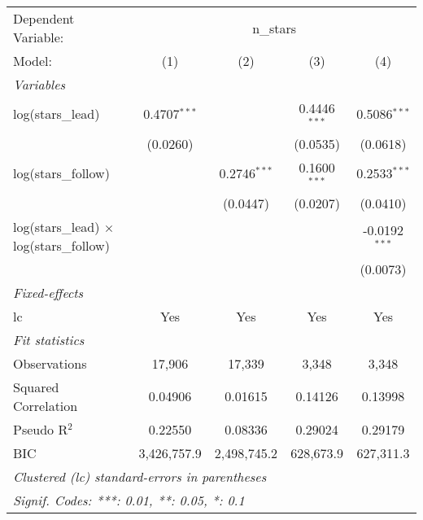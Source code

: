 
\begingroup
\centering
\begin{tabular}{lcccc}
   \tabularnewline \midrule \midrule
   Dependent Variable: & \multicolumn{4}{c}{n\_stars}\\
   Model:                                          & (1)            & (2)            & (3)            & (4)\\  
   \midrule
   \emph{Variables}\\
   log(stars\_lead)                                & 0.4707$^{***}$ &                & 0.4446$^{***}$ & 0.5086$^{***}$\\   
                                                   & (0.0260)       &                & (0.0535)       & (0.0618)\\   
   log(stars\_follow)                              &                & 0.2746$^{***}$ & 0.1600$^{***}$ & 0.2533$^{***}$\\   
                                                   &                & (0.0447)       & (0.0207)       & (0.0410)\\   
   log(stars\_lead) $\times$ log(stars\_follow)    &                &                &                & -0.0192$^{***}$\\   
                                                   &                &                &                & (0.0073)\\   
   \midrule
   \emph{Fixed-effects}\\
   lc                                              & Yes            & Yes            & Yes            & Yes\\  
   \midrule
   \emph{Fit statistics}\\
   Observations                                    & 17,906         & 17,339         & 3,348          & 3,348\\  
   Squared Correlation                             & 0.04906        & 0.01615        & 0.14126        & 0.13998\\  
   Pseudo R$^2$                                    & 0.22550        & 0.08336        & 0.29024        & 0.29179\\  
   BIC                                             & 3,426,757.9    & 2,498,745.2    & 628,673.9      & 627,311.3\\  
   \midrule \midrule
   \multicolumn{5}{l}{\emph{Clustered (lc) standard-errors in parentheses}}\\
   \multicolumn{5}{l}{\emph{Signif. Codes: ***: 0.01, **: 0.05, *: 0.1}}\\
\end{tabular}
\par\endgroup


